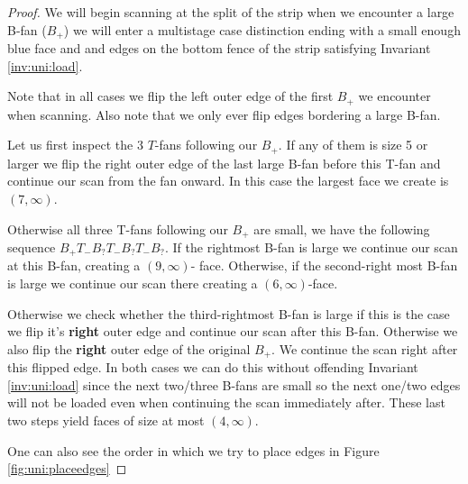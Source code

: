     \begin{proof}
      We will begin scanning at the split of the strip when we encounter a large B-fan ($B_+$) we  will enter a multistage case distinction ending with a small enough blue face and and edges on the bottom fence of the strip satisfying Invariant \ref{inv:uni:load}.

      Note that in all cases we flip the left outer edge of the first $B_+$ we encounter when scanning. Also note that we only ever flip edges bordering a large B-fan.

      Let us first inspect the 3 $T$-fans following our $B_+$. If any of them is size 5 or larger we flip the right outer edge of the last large B-fan before this T-fan and continue our scan from the fan onward. In this case the largest face we create is $(7, \infty)$.

      Otherwise all three T-fans following our $B_+$ are small, we have the following sequence $B_+ T_- B_? T_- B_? T_- B_?$. If the rightmost B-fan is large we continue our scan at this B-fan, creating a $(9, \infty)$- face. Otherwise, if the second-right most B-fan is large we continue our scan there creating a $(6, \infty)$-face.

      Otherwise we check whether the third-rightmost B-fan is large if this is the case we flip it's \textbf{right} outer edge and continue our scan after this B-fan. Otherwise we also flip the \textbf{right} outer edge of the original $B_+$. We continue the scan right after this flipped edge. In both cases we can do this without offending Invariant \ref{inv:uni:load} since the next two/three B-fans are small so the next one/two edges will not be loaded even when continuing the scan immediately after. These last two steps yield faces of size at most $(4, \infty)$.

      One can also see the order in which we try to place edges in Figure \ref{fig:uni:placeedges}


\end{proof}
